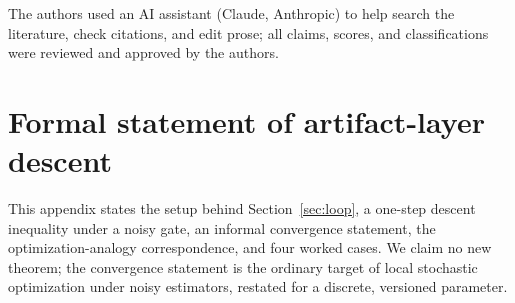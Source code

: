 \documentclass[
  11pt,
]{article}
\begin{document}
The authors used an AI assistant (Claude, Anthropic) to help search the literature, check citations, and edit prose; all claims, scores, and classifications were reviewed and approved by the authors.


\appendix

\section{Formal statement of artifact-layer descent}\label{app:formal}

This appendix states the setup behind Section~\ref{sec:loop}, a one-step descent inequality under a noisy gate, an informal convergence statement, the optimization-analogy correspondence, and four worked cases. We claim no new theorem; the convergence statement is the ordinary target of local stochastic optimization under noisy estimators, restated for a discrete, versioned parameter.
\end{document}
